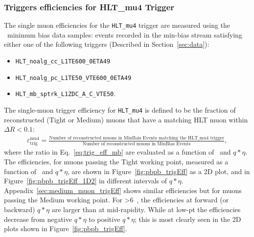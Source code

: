 \subsubsection{Triggers efficiencies for HLT\_mu4 Trigger}
The single muon efficiencies for the \verb=HLT_mu4= trigger are measured using the \PbPb\ minimum bias
  data samples: events recorded in the min-bias stream satisfying either one
  of the following triggers (Described in Section~\ref{sec:data}):
\begin{itemize}
\item \verb=HLT_noalg_cc_L1TE600_0ETA49=
\item \verb=HLT_noalg_pc_L1TE50_VTE600_0ETA49=
\item \verb=HLT_mb_sptrk_L1ZDC_A_C_VTE50=.
\end{itemize}
The single-muon trigger efficiency for \verb=HLT_mu4= 
  is defined to be the fraction of reconstructed (Tight or Medium) muons
  that have a matching HLT muon within $\Delta R < 0.1$:
\begin{eqnarray}
\varepsilon_{\mathrm{trig}}^{\mathrm{mu4}}=
\frac{\text{Number of reconstructed muons in MinBais Events matching the HLT\_mu4 trigger}}{\text{Number of reconstructed muons in MinBias Events}},
\label{eq:trig_eff_mb}
\end{eqnarray}
  where the ratio in Eq.~\ref{eq:trig_eff_mb} are evaluated as a function of \pt\ and $q*\eta$.
The efficiencies, for muons passing the Tight working point,
  measured as a function of \pT\ and $q*\eta$,
  are shown in Figure~\ref{fig:pbpb_trigEff} as a 2D plot, and in
  Figure~\ref{fig:pbpb_trigEff_1D2}
  in different intervals of $q*\eta$.
Appendix~\ref{sec:medium_muon_trigEff} shows similar 
  efficiencies but for muons passing the Medium working point.
For \pt>6~\GeV, the efficiencies at forward (or backward) $q*\eta$ are larger
  than at mid-rapidity.
While at low-pt the efficiencies decrease from negative $q*\eta$ to positive
  $q*\eta$; this is most clearly seen in the 2D plots shown in Figure~\ref{fig:pbpb_trigEff}.

